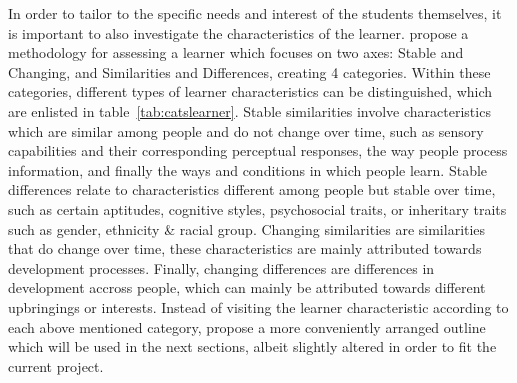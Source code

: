 In order to tailor to the specific needs and interest of the students themselves, it is important to also investigate the characteristics of the learner.  propose a methodology for assessing a learner which focuses on two axes: Stable and Changing, and Similarities and Differences, creating 4 categories. Within these categories, different types of learner characteristics can be distinguished, which are enlisted in table~\ref{tab:catslearner}. Stable similarities involve characteristics which are similar among people and do not change over time, such as sensory capabilities and their corresponding perceptual responses, the way people process information, and finally the ways and conditions in which people learn. Stable differences relate to characteristics different among people but stable over time, such as certain aptitudes, cognitive styles, psychosocial traits, or inheritary traits such as gender, ethnicity \& racial group. Changing similarities are similarities that do change over time, these characteristics are mainly attributed towards development processes. Finally, changing differences are differences in development accross people, which can mainly be attributed towards different upbringings or interests. Instead of visiting the learner characteristic according to each above mentioned category,  propose a more conveniently arranged outline which will be used in the next sections, albeit slightly altered in order to fit the current project.

